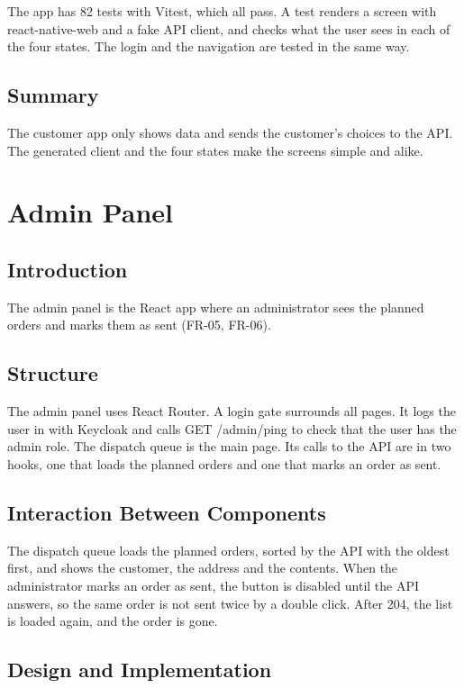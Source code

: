 The app has 82 tests with Vitest, which all pass. A test renders a screen with
react-native-web and a fake API client, and checks what the user sees in each of the four
states. The login and the navigation are tested in the same way.

\subsection{Summary}

The customer app only shows data and sends the customer's choices to the API. The
generated client and the four states make the screens simple and alike.

\section{Admin Panel}\label{sec:design-admin-panel}

\subsection{Introduction}

The admin panel is the React app where an administrator sees the planned orders and
marks them as sent (FR-05, FR-06).

\subsection{Structure}

The admin panel uses React Router. A login gate surrounds all pages. It logs the user
in with Keycloak and calls GET /admin/ping to check that the user has the admin role.
The dispatch queue is the main page. Its calls to the API are in two hooks, one that
loads the planned orders and one that marks an order as sent.

\subsection{Interaction Between Components}

The dispatch queue loads the planned orders, sorted by the API with the oldest first, and
shows the customer, the address and the contents. When the administrator marks an order
as sent, the button is disabled until the API answers, so the same order is not sent
twice by a double click. After 204, the list is loaded again, and the order is gone.

\subsection{Design and Implementation}

